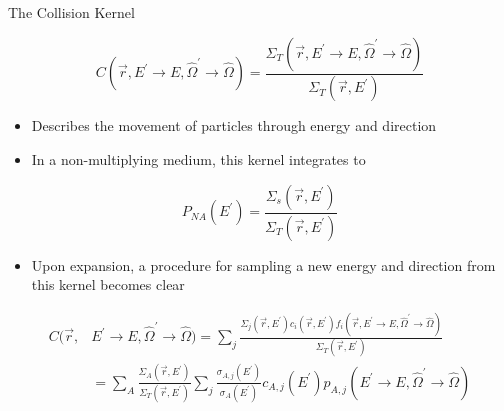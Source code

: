 \documentclass{beamer}
\begin{document}
\begin{frame}{The Collision Kernel}

  \begin{equation*}
    C(\vec{r},E^{'} \to E, \hat{\Omega}^{'} \to \hat{\Omega}) =
    \frac{\Sigma_T(\vec{r},E^{'} \to E,\hat{\Omega}^{'} \to \hat{\Omega})}
         {\Sigma_T(\vec{r},E^{'})}
  \end{equation*}

  \begin{itemize}
    \item Describes the movement of particles through energy and direction
      \medskip
    \item In a non-multiplying medium, this kernel integrates to
  \end{itemize}
  \begin{equation*}
    P_{NA}(E^{'}) = \frac{\Sigma_s(\vec{r},E^{'})}{\Sigma_T(\vec{r},E^{'})} 
  \end{equation*}
  
  \begin{itemize}
    \item Upon expansion, a procedure for sampling a new energy and direction
      from this kernel becomes clear
  \end{itemize}
  \begin{align}
    C(\vec{r},&E^{'} \to E, \hat{\Omega}^{'} \to \hat{\Omega}) =
    \sum_j \frac{\Sigma_j(\vec{r},E^{'})c_i(\vec{r},E^{'})
      f_i(\vec{r},E^{'} \to E,\hat{\Omega}^{'} \to \hat{\Omega})}
        {\Sigma_T(\vec{r},E^{'})} \nonumber \\
      & = \sum_A \frac{\Sigma_A(\vec{r},E^{'})}{\Sigma_T(\vec{r},E^{'})}
        \sum_j \frac{\sigma_{A,j}(E^{'})}{\sigma_A(E^{'})} c_{A,j}(E^{'})
        p_{A,j}(E^{'} \to E,\hat{\Omega}^{'} \to \hat{\Omega}) \nonumber
  \end{align}

\end{frame}
\end{document}
